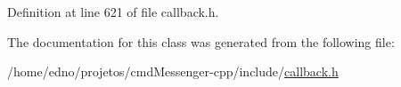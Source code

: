 Definition at line 621 of file callback.\+h.



The documentation for this class was generated from the following file\+:\begin{DoxyCompactItemize}
\item 
/home/edno/projetos/cmd\+Messenger-\/cpp/include/\hyperlink{callback_8h}{callback.\+h}\end{DoxyCompactItemize}
